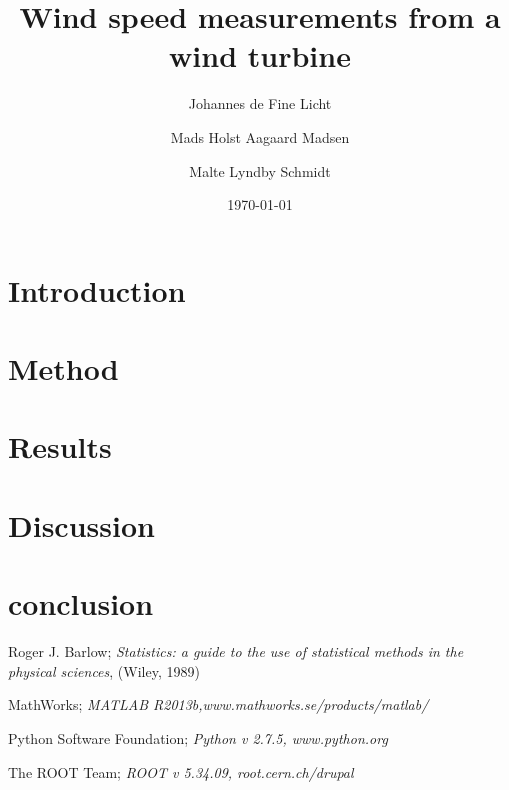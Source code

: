\documentclass[a4paper,%
               reprint,%
               aps,%
               prl,%
               amsfonts,%
               amssymb,%
               amsmath,%
               twoside,%
               balancelastpage,%
               eqsecnum]%
               {revtex4-1}
\begin{document}

\title{Wind speed measurements from a wind turbine}
\date{\today}                                                 %
\author{Johannes de Fine Licht}                                    %
\author{Mads Holst Aagaard Madsen}  
\author{Malte Lyndby Schmidt}       

\begin{abstract}                                              

\end{abstract}

\maketitle                                                    %

\section{Introduction}
\label{sec:introduction}


\section{Method}
\label{sec:method}


\section{Results}
\label{sec:results}


\section{Discussion}
\label{sec:discussion}


\section{conclusion}
\label{sec:conclusion}



\begin{thebibliography}{99}                                   

   Roger J. Barlow; \emph{Statistics: a guide to the use of
     statistical methods in the physical sciences}, (Wiley, 1989) 

   MathWorks; \emph{MATLAB R2013b,www.mathworks.se/products/matlab/} 
  
  Python Software Foundation; \emph{Python v 2.7.5, www.python.org} 

  The ROOT Team; \emph{ROOT v 5.34.09, root.cern.ch/drupal} 
  
\end{thebibliography}
\end{document}
